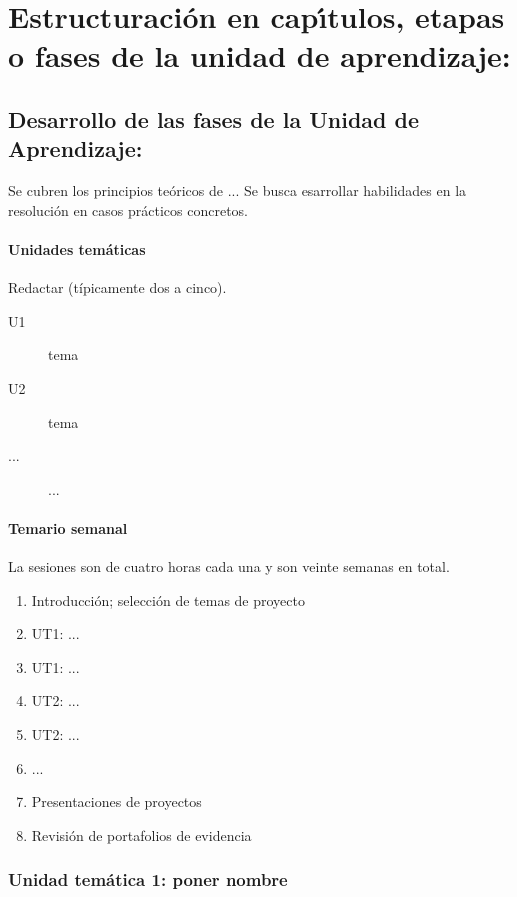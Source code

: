\documentclass[10 pt]{article}
\begin{document}
\newpage
\section{Estructuraci\'{o}n en cap\'{\i}tulos, etapas o fases de la unidad de
  aprendizaje:}
\subsection{Desarrollo de las fases de la Unidad de Aprendizaje:}

Se cubren los principios te\'{o}ricos de ...
Se busca esarrollar habilidades en la resoluci\'{o}n en
casos pr\'{a}cticos concretos.

\paragraph{Unidades tem\'{a}ticas}

\quad

Redactar (t\'{i}picamente dos a cinco).

\begin{description}
\item[U1]{tema}
\item[U2]{tema}
\item[...]{...}
\end{description}

\paragraph{Temario semanal}

\quad

La sesiones son de cuatro horas cada una y son veinte
semanas en total.
\begin{enumerate}[itemsep=-3pt]
\item{Introducci\'{o}n; selecci\'{o}n de temas de proyecto}
\item{UT1: ...}
\item{UT1: ...}
\item{UT2: ...}
\item{UT2: ...}
\item{...}
\item{Presentaciones de proyectos}
\item{Revisi\'{o}n de portafolios de evidencia}
\end{enumerate}

\subsubsection{Unidad tem\'{a}tica 1: poner nombre}
\end{document}
